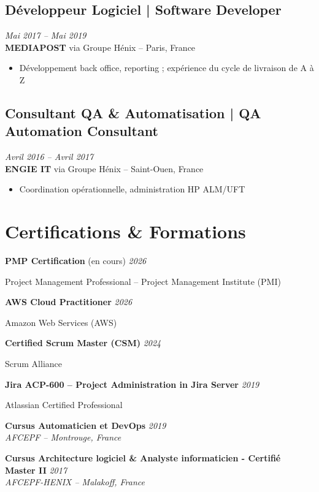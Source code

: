 \documentclass[11pt,a4paper]{article}
\begin{document}
\subsection*{Développeur Logiciel | Software Developer} \hfill \textit{Mai 2017 -- Mai 2019}\\
\textbf{MEDIAPOST} via Groupe Hénix -- Paris, France\\
\begin{itemize}
    \item Développement back office, reporting ; expérience du cycle de livraison de A à Z
\end{itemize}

\subsection*{Consultant QA \& Automatisation | QA Automation Consultant} \hfill \textit{Avril 2016 -- Avril 2017}\\
\textbf{ENGIE IT} via Groupe Hénix -- Saint-Ouen, France\\
\begin{itemize}
    \item Coordination opérationnelle, administration HP ALM/UFT
\end{itemize}

\section*{Certifications \& Formations}

\textbf{PMP Certification} (en cours) \hfill \textit{2026}

Project Management Professional -- Project Management Institute (PMI)

\textbf{AWS Cloud Practitioner} \hfill \textit{2026}

Amazon Web Services (AWS)

\textbf{Certified Scrum Master (CSM)} \hfill \textit{2024}

Scrum Alliance

\textbf{Jira ACP-600 -- Project Administration in Jira Server} \hfill \textit{2019}

Atlassian Certified Professional

\textbf{Cursus Automaticien et DevOps} \hfill \textit{2019}\\
\textit{AFCEPF -- Montrouge, France}

\textbf{Cursus Architecture logiciel \& Analyste informaticien - Certifié Master II} \hfill \textit{2017}\\
\textit{AFCEPF-HENIX -- Malakoff, France}
\end{document}
